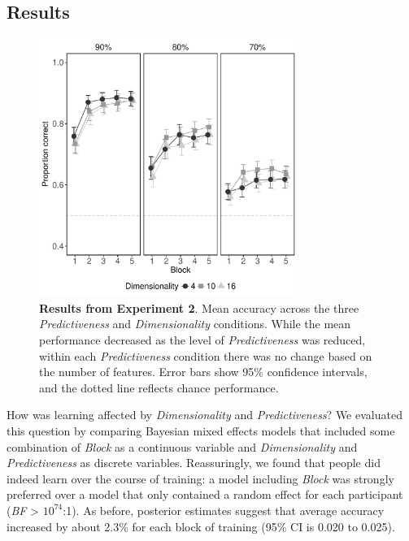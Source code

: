 \documentclass[a4paper, doc, floatsintext]{apa6}
\begin{document}
\subsection{Results}

\begin{figure}[th!]
  \begin{center}
    \includegraphics[width=0.75\textwidth]{figures/mean-performance-experiment-two.pdf}
    \caption{\small{\textbf{Results from Experiment 2}. Mean accuracy across the three \textit{Predictiveness} and \textit{Dimensionality} conditions. While the mean performance decreased as the level of \textit{Predictiveness} was reduced, within each \textit{Predictiveness} condition there was no change based on the number of features. Error bars show 95\% confidence intervals, and the dotted line reflects chance performance.}}
    \label{mean-performance-experiment-two}
  \end{center}
\end{figure}

How was learning affected by \textit{Dimensionality} and \textit{Predictiveness}? We evaluated this question by comparing Bayesian mixed effects models that included some combination of \textit{Block} as a continuous variable and \textit{Dimensionality} and \textit{Predictiveness} as discrete variables. Reassuringly, we found that people did indeed learn over the course of training: a model including \textit{Block} was strongly preferred over a model that only contained a random effect for each participant (\textit{BF} > \(10^{74}\):1). As before, posterior estimates suggest that average accuracy increased by about 2.3\% for each block of training (95\% CI is 0.020 to 0.025).
\end{document}
